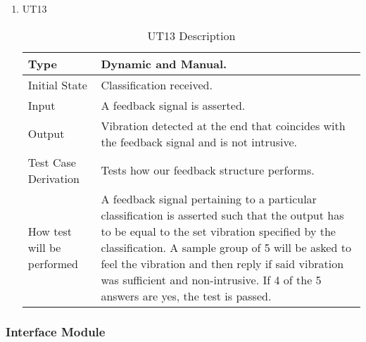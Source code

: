 \documentclass[12pt, titlepage]{article}
\begin{document}
\begin{enumerate}

\item{UT13}
\begin{table}[H]
    \caption{UT13 Description}
\begin{tabular}{ |p{5cm}||p{7cm}| }
    \hline
    Type & Dynamic and Manual. \\
    \hline
    Initial State  &  Classification received. \\
    \hline
    Input &   A feedback signal is asserted. \\
    \hline
    Output &   Vibration detected at the end that coincides with the feedback signal and is not intrusive.  \\
    \hline
    Test Case Derivation &   Tests how our feedback structure performs. \\
    \hline
    How test will be performed & A feedback signal pertaining to a particular classification is asserted such that the output has to be equal to the set vibration specified by the classification. A sample group of 5 will be asked to feel the vibration and then reply if said vibration was sufficient and non-intrusive. If 4 of the 5 answers are yes, the test is passed. \\
    \hline
\end{tabular}
\end{table}
\end{enumerate}



\subsubsection{Interface Module}
\end{document}
